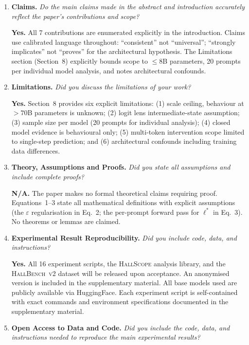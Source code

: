 \documentclass{article}
\begin{document}
{\small
\begin{enumerate}[leftmargin=*,label=\arabic*.,itemsep=8pt]

\item \textbf{Claims.}
\textit{Do the main claims made in the abstract and introduction accurately
reflect the paper's contributions and scope?}

\textbf{Yes.}
All 7 contributions are enumerated explicitly in the introduction.
Claims use calibrated language throughout: ``consistent'' not ``universal'';
``strongly implicates'' not ``proves'' for the architectural hypothesis.
The Limitations section (Section~8) explicitly bounds scope to $\leq$8B
parameters, 20 prompts per individual model analysis, and notes architectural
confounds.

\item \textbf{Limitations.}
\textit{Did you discuss the limitations of your work?}

\textbf{Yes.}
Section~8 provides six explicit limitations:
(1) scale ceiling, behaviour at $>70$B parameters is unknown;
(2) logit lens intermediate-state assumption;
(3) sample size per model (20 prompts for individual analysis);
(4) closed model evidence is behavioural only;
(5) multi-token intervention scope limited to single-step prediction; and
(6) architectural confounds including training data differences.

\item \textbf{Theory, Assumptions and Proofs.}
\textit{Did you state all assumptions and include complete proofs?}

\textbf{N/A.}
The paper makes no formal theoretical claims requiring proof.
Equations~1--3 state all mathematical definitions with explicit assumptions
(the $\varepsilon$ regularisation in Eq.~2; the per-prompt forward pass
for $\ell^*$ in Eq.~3).
No theorems or lemmas are claimed.

\item \textbf{Experimental Result Reproducibility.}
\textit{Did you include code, data, and instructions?}

\textbf{Yes.}
All 16 experiment scripts, the \textsc{HallScope} analysis library,
and the \textsc{HallBench~v2} dataset will be released upon acceptance.
An anonymised version is included in the supplementary material.
All base models used are publicly available via HuggingFace.
Each experiment script is self-contained with exact commands and
environment specifications documented in the supplementary material.

\item \textbf{Open Access to Data and Code.}
\textit{Did you include the code, data, and instructions needed to reproduce
the main experimental results?}


\end{enumerate}}
\end{document}
